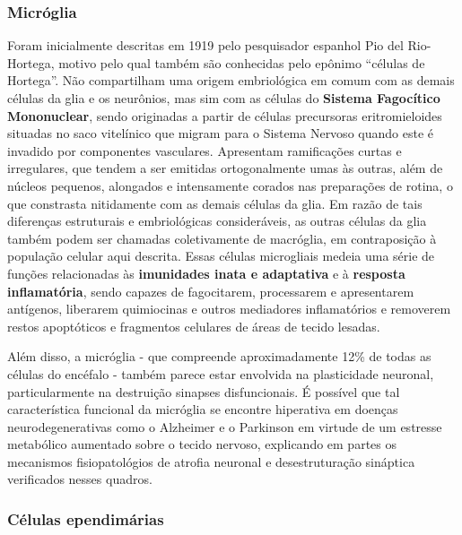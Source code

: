 \documentclass[
]{book}
\begin{document}
\hypertarget{micruxf3glia}{%
\subsubsection*{Micróglia}\label{micruxf3glia}}

Foram inicialmente descritas em 1919 pelo pesquisador espanhol Pio del Rio-Hortega, motivo pelo qual também são conhecidas pelo epônimo ``células de Hortega''. Não compartilham uma origem embriológica em comum com as demais células da glia e os neurônios, mas sim com as células do \textbf{Sistema Fagocítico Mononuclear}, sendo originadas a partir de células precursoras eritromieloides situadas no saco vitelínico que migram para o Sistema Nervoso quando este é invadido por componentes vasculares. Apresentam ramificações curtas e irregulares, que tendem a ser emitidas ortogonalmente umas às outras, além de núcleos pequenos, alongados e intensamente corados nas preparações de rotina, o que constrasta nitidamente com as demais células da glia. Em razão de tais diferenças estruturais e embriológicas consideráveis, as outras células da glia também podem ser chamadas coletivamente de macróglia, em contraposição à população celular aqui descrita. Essas células microgliais medeia uma série de funções relacionadas às \textbf{imunidades inata e adaptativa} e à \textbf{resposta inflamatória}, sendo capazes de fagocitarem, processarem e apresentarem antígenos, liberarem quimiocinas e outros mediadores inflamatórios e removerem restos apoptóticos e fragmentos celulares de áreas de tecido lesadas.

Além disso, a micróglia - que compreende aproximadamente 12\% de todas as células do encéfalo - também parece estar envolvida na plasticidade neuronal, particularmente na destruição sinapses disfuncionais. É possível que tal característica funcional da micróglia se encontre hiperativa em doenças neurodegenerativas como o Alzheimer e o Parkinson em virtude de um estresse metabólico aumentado sobre o tecido nervoso, explicando em partes os mecanismos fisiopatológios de atrofia neuronal e desestruturação sináptica verificados nesses quadros.

\hypertarget{cuxe9lulas-ependimuxe1rias}{%
\subsubsection*{Células ependimárias}\label{cuxe9lulas-ependimuxe1rias}}
\end{document}
